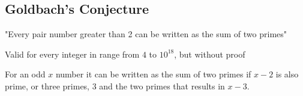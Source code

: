 \subsection{Goldbach's Conjecture}

"Every pair number greater than 2 can be written as the sum of two primes"

Valid for every integer in range from $4$ to $10^{18}$, but without proof

For an odd $x$ number it can be written as the sum of two primes if $x - 2$ is also prime, or three primes, $3$ and the two primes that results in $x-3$.
